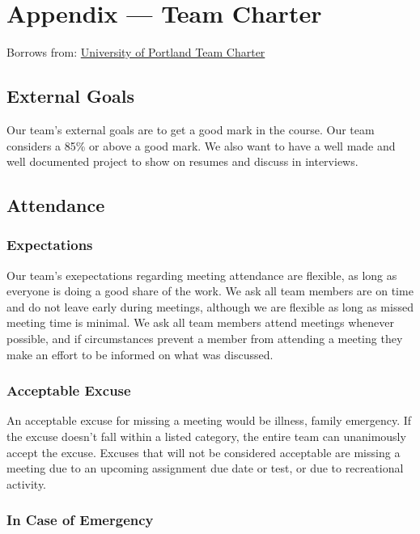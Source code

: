 \documentclass{article}
\begin{document}
\newpage{}

\section*{Appendix --- Team Charter}

Borrows from:
\href{https://engineering.up.edu/industry_partnerships/files/team-charter.pdf}
{University of Portland Team Charter}

\subsection*{External Goals}

Our team's external goals are to get a good mark in the course. Our team
considers a 85\% or above a good mark. We also want to have a well made and
well documented project to show on resumes and discuss in interviews.

\subsection*{Attendance}

\subsubsection*{Expectations}

Our team's exepectations regarding meeting attendance are flexible, as long as everyone is doing
a good share of the work. We ask all team members are on time and do not leave early during
meetings, although we are flexible as long as missed meeting time is minimal. We ask all team 
members attend meetings whenever possible, and if circumstances prevent a member from attending
a meeting they make an effort to be informed on what was discussed.

\subsubsection*{Acceptable Excuse}

An acceptable excuse for missing a meeting would be illness, family emergency. If the excuse doesn't fall within a listed category,
the entire team can unanimously accept the excuse. Excuses that will not be considered acceptable
are missing a meeting due to an upcoming assignment due date or test, or due to recreational
activity.

\subsubsection*{In Case of Emergency}
\end{document}
